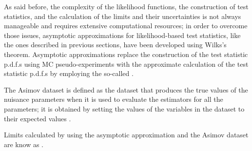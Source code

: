 As said before, the complexity of the likelihood functions, the construction of test statistics, and the calculation of the limits and their uncertainties is not always manageable and requires extensive computational resources; in order to overcome those issues, asymptotic approximations for likelihood-based test statistics, like the ones described in previous sections, have been developed \cite{wald,asymptotic} using Wilks's theorem. Asymptotic approximations replace the construction of the test statistic p.d.f.s using MC pseudo-experiments with the approximate calculation of the test statistic p.d.f.s by employing the so-called .

The Asimov dataset is defined as the dataset that produces the true values of the nuisance parameters when it is used to evaluate the estimators for all the parameters; it is obtained by setting the values of the variables in the dataset to their expected values \cite{asymptotic}.

Limits calculated by using the asymptotic approximation and the Asimov dataset are know as .
